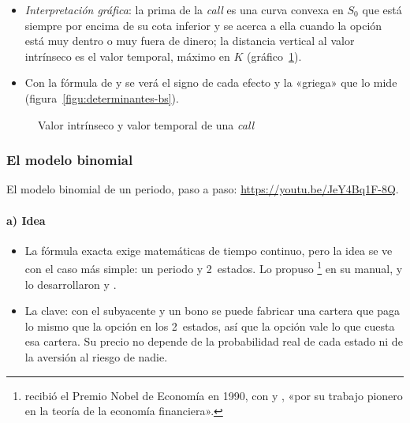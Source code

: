 \documentclass[11pt]{article}
\begin{document}
\begin{itemize}
\begin{itemize}
  \item En cambio, una \emph{put} europea muy dentro de dinero puede valer menos que su valor intrínseco: su valor temporal es negativo.
  \end{itemize}
\item \emph{Interpretación gráfica}: la prima de la \emph{call} es una curva convexa en $S_0$ que está siempre por encima de su cota inferior y se acerca a ella cuando la opción está muy dentro o muy fuera de dinero; la distancia vertical al valor intrínseco es el valor temporal, máximo en $K$ (gráfico~\ref{fig:valor-call}).
\item Con la fórmula de  y  se verá el signo de cada efecto y la «griega» que lo mide (figura~\ref{figu:determinantes-bs}).
\end{itemize}

\begin{figure}[H]
\centering
\caption{Valor intrínseco y valor temporal de una \emph{call}}\label{fig:valor-call}
\end{figure}


\subsubsection{El modelo binomial}\label{sec:binomial}

\begin{anotaciones}
El modelo binomial de un periodo, paso a paso: \url{https://youtu.be/JeY4Bq1F-8Q}.
\end{anotaciones}

\paragraph{a) Idea}

\begin{itemize}
\item La fórmula exacta exige matemáticas de tiempo continuo, pero la idea se ve con el caso más simple: un periodo y 2~estados. Lo propuso \textcite{Sharpe1978Investments}\footnote{ recibió el Premio Nobel de Economía en 1990, con  y , «por su trabajo pionero en la teoría de la economía financiera»\nocite{Nobel1990Markowitz}.} en su manual, y lo desarrollaron \textcite{CoxRossRubinstein1979Option} y \textcite{RendlemanBartter1979Two}.
\item La clave: con el subyacente y un bono se puede fabricar una cartera que paga lo mismo que la opción en los 2~estados, así que la opción vale lo que cuesta esa cartera. Su precio no depende de la probabilidad real de cada estado ni de la aversión al riesgo de nadie.
\end{itemize}
\end{document}

